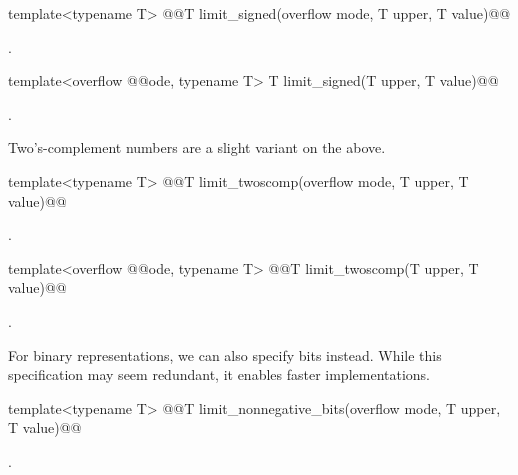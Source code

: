 \begin{addedblock}
\begin{itemdecl}
template<typename T> @@T limit_signed(overflow mode, T upper, T value)@\addmodif{;}@
\end{itemdecl}

\begin{itemdescr}
\returns {}.	
\end{itemdescr}

\begin{itemdecl}
template<overflow @@ode, typename T> T limit_signed(T upper, T value)@\addmodif{;}@
\end{itemdecl}

\begin{itemdescr}
\returns {}.	
\end{itemdescr}

Two's-complement numbers are a slight variant on the above.

\begin{itemdecl}
template<typename T> @@T limit_twoscomp(overflow mode, T upper, T value)@\addmodif{;}@
\end{itemdecl}

\begin{itemdescr}
\returns {}.
\end{itemdescr}

\begin{itemdecl}
template<overflow @@ode, typename T> @@T limit_twoscomp(T upper, T value)@\addmodif{;}@
\end{itemdecl}

\begin{itemdescr}
\returns {}.	
\end{itemdescr}

For binary representations, we can also specify bits instead. While this specification may seem redundant, it enables faster implementations.

\begin{itemdecl}
template<typename T> @@T limit_nonnegative_bits(overflow mode, T upper, T value)@\addmodif{;}@
\end{itemdecl}

\begin{itemdescr}
\returns {}.	
\end{itemdescr}


\end{addedblock}
